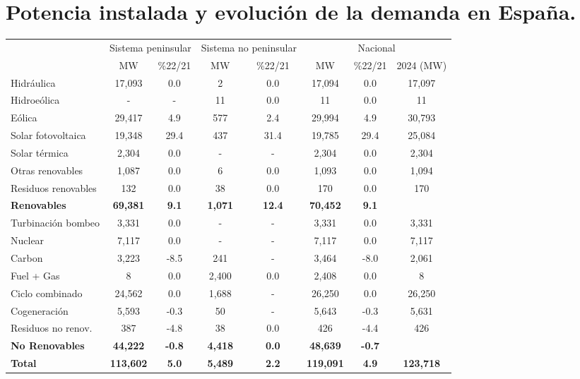 \section{Potencia instalada y evolución de la demanda en España.}
	\begin{table}[H]
		\renewcommand{\arraystretch}{1.2}
		\centering
		\begin{tabular}{lcc|cc|ccc}
			& \multicolumn{2}{c|}{Sistema peninsular} & \multicolumn{2}{c|}{Sistema no peninsular} & \multicolumn{3}{c}{Nacional} \\
			\cline{2-8}
			& MW & \%22/21 & MW & \%22/21 & MW & \%22/21 & 2024 (MW)\\
			\hline
			Hidráulica & 17,093 & 0.0 & 2 & 0.0 & 17,094 & 0.0 & 17,097 \\
			Hidroeólica & - & - & 11 & 0.0 & 11 & 0.0 & 11\\
			Eólica & 29,417 & 4.9 & 577 & 2.4 & 29,994 & 4.9 & 30,793 \\
			Solar fotovoltaica & 19,348 & 29.4 & 437 & 31.4 & 19,785 & 29.4 & 25,084\\
			Solar térmica & 2,304 & 0.0 & - & - & 2,304 & 0.0 & 2,304\\
			Otras renovables & 1,087 & 0.0 & 6 & 0.0 & 1,093 & 0.0 & 1,094\\
			Residuos renovables & 132 & 0.0 & 38 & 0.0 & 170 & 0.0 & 170\\
			\textbf{Renovables} & \textbf{69,381} & \textbf{9.1} & \textbf{1,071} & \textbf{12.4} & \textbf{70,452} & \textbf{9.1} & \\
			Turbinación bombeo & 3,331 & 0.0 & - & - & 3,331 & 0.0 & 3,331\\
			Nuclear & 7,117 & 0.0 & - & - & 7,117 & 0.0 & 7,117\\
			Carbon & 3,223 & -8.5 & 241 & - & 3,464 & -8.0 & 2,061\\
			Fuel + Gas & 8 & 0.0 & 2,400 & 0.0 & 2,408 & 0.0 & 8\\
			Ciclo combinado & 24,562 & 0.0 & 1,688 & - & 26,250 & 0.0 & 26,250\\
			Cogeneración & 5,593 & -0.3 & 50 & - & 5,643 & -0.3 & 5,631\\
			Residuos no renov. & 387 & -4.8 & 38 & 0.0 & 426 & -4.4 & 426\\
			\textbf{No Renovables} & \textbf{44,222} & \textbf{-0.8} & \textbf{4,418} & \textbf{0.0} & \textbf{48,639} & \textbf{-0.7} & \\
			\hline
			\textbf{Total} & \textbf{113,602} & \textbf{5.0} & \textbf{5,489} & \textbf{2.2} & \textbf{119,091} & \textbf{4.9} & \textbf{123,718}\\
		\end{tabular}
	\end{table}

